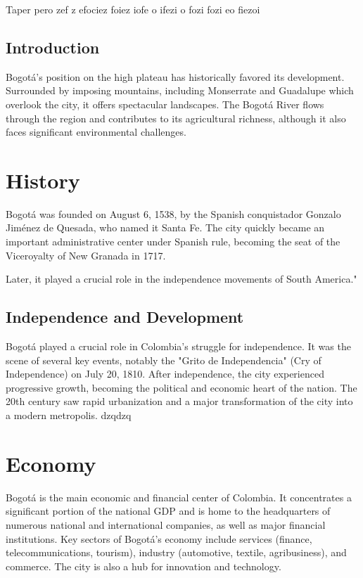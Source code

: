 \documentclass{article}
\begin{document}
Taper pero zef
 z
efociez foiez
 iofe
o ifezi
o fozi
 fozi
eo fiezoi



\subsection{Introduction}
Bogotá's position on the high plateau has historically favored its development. Surrounded by imposing mountains, including Monserrate and Guadalupe which overlook the city, it offers spectacular landscapes. The Bogotá River flows through the region and contributes to its agricultural richness, although it also faces significant environmental challenges.

\section{History}
Bogotá was founded on August 6, 1538, by the Spanish conquistador Gonzalo Jiménez de Quesada, who named it Santa Fe. The city quickly became an important administrative center under Spanish rule, becoming the seat of the Viceroyalty of New Granada in 1717.

Later, it played a crucial role in the independence movements of South America."

\subsection{Independence and Development}
Bogotá played a crucial role in Colombia's struggle for independence. It was the scene of several key events, notably the "Grito de Independencia" (Cry of Independence) on July 20, 1810. After independence, the city experienced progressive growth, becoming the political and economic heart of the nation. The 20th century saw rapid urbanization and a major transformation of the city into a modern metropolis.
dzqdzq
\section{Economy}
Bogotá is the main economic and financial center of Colombia. It concentrates a significant portion of the national GDP and is home to the headquarters of numerous national and international companies, as well as major financial institutions. Key sectors of Bogotá's economy include services (finance, telecommunications, tourism), industry (automotive, textile, agribusiness), and commerce. The city is also a hub for innovation and technology.
\end{document}
